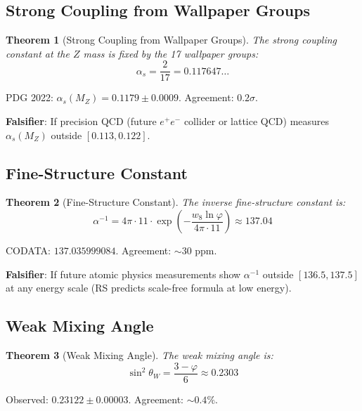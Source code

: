\documentclass[12pt,a4paper]{article}
\newtheorem{theorem}{Theorem}[section]
\theoremstyle{definition}
\theoremstyle{remark}
\begin{document}
\subsection{Strong Coupling from Wallpaper Groups}

\begin{theorem}[Strong Coupling from Wallpaper Groups]
The strong coupling constant at the $Z$ mass is fixed by the 17 wallpaper groups:
\begin{equation}
\boxed{\alpha_s = \frac{2}{17} = 0.117647\ldots}
\end{equation}
\end{theorem}

PDG 2022: $\alpha_s(M_Z) = 0.1179 \pm 0.0009$. Agreement: $0.2\sigma$.

\textbf{Falsifier}: If precision QCD (future $e^+e^-$ collider or lattice QCD) 
measures $\alpha_s(M_Z)$ outside $[0.113, 0.122]$.

\subsection{Fine-Structure Constant}

\begin{theorem}[Fine-Structure Constant]
The inverse fine-structure constant is:
\begin{equation}
\alpha^{-1} = 4\pi \cdot 11 \cdot \exp\!\left(-\frac{w_8 \ln\varphi}{4\pi\cdot 11}\right) \approx 137.04
\end{equation}
\end{theorem}

CODATA: $137.035999084$. Agreement: $\sim 30$ ppm.

\textbf{Falsifier}: If future atomic physics measurements show $\alpha^{-1}$ outside 
$[136.5, 137.5]$ at any energy scale (RS predicts scale-free formula at low energy).

\subsection{Weak Mixing Angle}

\begin{theorem}[Weak Mixing Angle]
The weak mixing angle is:
\begin{equation}
\sin^2\theta_W = \frac{3-\varphi}{6} \approx 0.2303
\end{equation}
\end{theorem}

Observed: $0.23122 \pm 0.00003$. Agreement: $\sim 0.4\%$.
\end{document}
